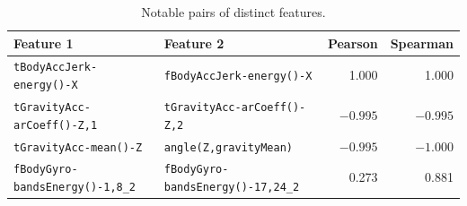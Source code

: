 \documentclass[a4paper, 11pt]{article}
\begin{document}
\begin{table}[htbp]
\centering
\caption{Notable pairs of distinct features.}
\label{tab:pairs}
\footnotesize
\begin{tabular}{llrr}
\toprule
Feature 1 & Feature 2 & Pearson & Spearman \\
\midrule
\texttt{tBodyAccJerk-energy()-X} & \texttt{fBodyAccJerk-energy()-X} & 1.000 & 1.000 \\
\texttt{tGravityAcc-arCoeff()-Z,1} & \texttt{tGravityAcc-arCoeff()-Z,2} & $-0.995$ & $-0.995$ \\
\texttt{tGravityAcc-mean()-Z} & \texttt{angle(Z,gravityMean)} & $-0.995$ & $-1.000$ \\
\texttt{fBodyGyro-bandsEnergy()-1,8\_2} & \texttt{fBodyGyro-bandsEnergy()-17,24\_2} & 0.273 & 0.881 \\
\bottomrule
\end{tabular}
\end{table}
\end{document}
